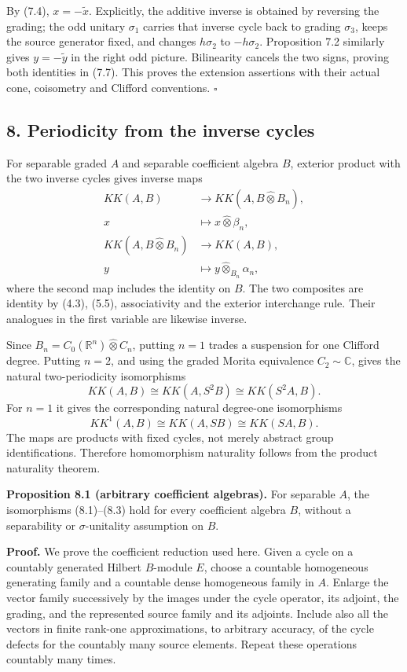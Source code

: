 \documentclass[
  11pt,
]{article}
\begin{document}
By (7.4), \(x=-\widetilde x\). Explicitly, the additive inverse is
obtained by reversing the grading; the odd unitary \(\sigma_1\) carries
that inverse cycle back to grading \(\sigma_3\), keeps the source
generator fixed, and changes \(h\sigma_2\) to \(-h\sigma_2\).
Proposition 7.2 similarly gives \(y=-\widetilde y\) in the right odd
picture. Bilinearity cancels the two signs, proving both identities in
(7.7). This proves the extension assertions with their actual cone,
coisometry and Clifford conventions. \(\square\)

\subsection{8. Periodicity from the inverse
cycles}\label{periodicity-from-the-inverse-cycles}

For separable graded \(A\) and separable coefficient algebra \(B\),
exterior product with the two inverse cycles gives inverse maps \[
\begin{aligned}
KK(A,B)&\longrightarrow KK(A,B\widehat\otimes B_n),\\
x&\longmapsto x\widehat\otimes\beta_n,\\
KK(A,B\widehat\otimes B_n)&\longrightarrow KK(A,B),\\
y&\longmapsto y\widehat\otimes_{B_n}\alpha_n,
\end{aligned}
\tag{8.1}
\] where the second map includes the identity on \(B\). The two
composites are identity by (4.3), (5.5), associativity and the exterior
interchange rule. Their analogues in the first variable are likewise
inverse.

Since \(B_n=C_0(\mathbb R^n)\widehat\otimes C_n\), putting \(n=1\)
trades a suspension for one Clifford degree. Putting \(n=2\), and using
the graded Morita equivalence \(C_2\sim\mathbb C\), gives the natural
two-periodicity isomorphisms \[
KK(A,B)\cong KK(A,S^2B)\cong KK(S^2A,B).
\tag{8.2}
\] For \(n=1\) it gives the corresponding natural degree-one
isomorphisms \[
KK^1(A,B)\cong KK(A,SB)\cong KK(SA,B).
\tag{8.3}
\] The maps are products with fixed cycles, not merely abstract group
identifications. Therefore homomorphism naturality follows from the
product naturality theorem.

\textbf{Proposition 8.1 (arbitrary coefficient algebras).} For separable
\(A\), the isomorphisms (8.1)--(8.3) hold for every coefficient algebra
\(B\), without a separability or \(\sigma\)-unitality assumption on
\(B\).

\textbf{Proof.} We prove the coefficient reduction used here. Given a
cycle on a countably generated Hilbert \(B\)-module \(E\), choose a
countable homogeneous generating family and a countable dense
homogeneous family in \(A\). Enlarge the vector family successively by
the images under the cycle operator, its adjoint, the grading, and the
represented source family and its adjoints. Include also all the vectors
in finite rank-one approximations, to arbitrary accuracy, of the cycle
defects for the countably many source elements. Repeat these operations
countably many times.
\end{document}
